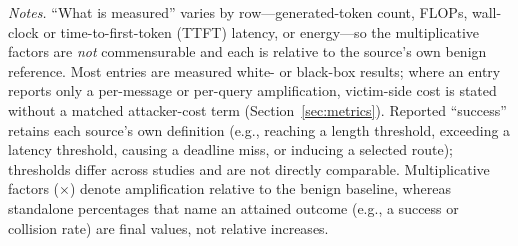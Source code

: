 \documentclass[acmsmall,screen,review,nonacm]{acmart}
\begin{document}
\begin{table}[htbp]

  {\footnotesize\par\vspace{2pt}\emph{Notes.} ``What is measured'' varies by row---generated-token count, FLOPs, wall-clock or time-to-first-token (TTFT) latency, or energy---so the multiplicative factors are \emph{not} commensurable and each is relative to the source's own benign reference. Most entries are measured white- or black-box results; where an entry reports only a per-message or per-query amplification, victim-side cost is stated without a matched attacker-cost term (Section~\ref{sec:metrics}). Reported ``success'' retains each source's own definition (e.g., reaching a length threshold, exceeding a latency threshold, causing a deadline miss, or inducing a selected route); thresholds differ across studies and are not directly comparable. Multiplicative factors ($\times$) denote amplification relative to the benign baseline, whereas standalone percentages that name an attained outcome (e.g., a success or collision rate) are final values, not relative increases.\par}
\end{table}
\end{document}
